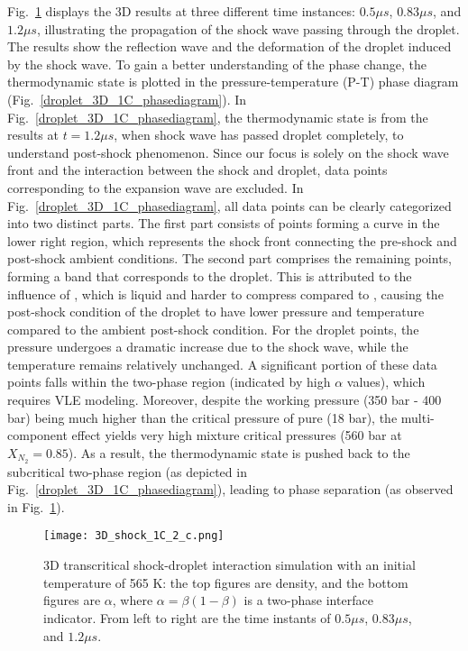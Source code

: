 Fig.~\ref{droplet_3d_1C} displays the 3D results at three different time instances: $0.5\mu s$, $0.83\mu s$, and $1.2\mu s$, illustrating the propagation of the shock wave passing through the droplet. The results show the reflection wave and the deformation of the droplet induced by the shock wave. To gain a better understanding of the phase change, the thermodynamic state is plotted in the pressure-temperature (P-T) phase diagram (Fig.~\ref{droplet_3D_1C_phasediagram}). In Fig.~\ref{droplet_3D_1C_phasediagram}, the thermodynamic state is from the results at $t=1.2\mu s$, when shock wave has passed droplet completely, to understand post-shock phenomenon. Since our focus is solely on the shock wave front and the interaction between the shock and droplet, data points corresponding to the expansion wave are excluded. In Fig.~\ref{droplet_3D_1C_phasediagram}, all data points can be clearly categorized into two distinct parts. The first part consists of points forming a curve in the lower right region, which represents the shock front connecting the pre-shock and post-shock ambient conditions. The second part comprises the remaining points, forming a band that corresponds to the droplet. This is attributed to the influence of , which is liquid and harder to compress compared to , causing the post-shock condition of the droplet to have lower pressure and temperature compared to the ambient post-shock condition. For the droplet points, the pressure undergoes a dramatic increase due to the shock wave, while the temperature remains relatively unchanged. A significant portion of these data points falls within the two-phase region (indicated by high $\alpha$ values), which requires VLE modeling. Moreover, despite the working pressure (350 bar - 400 bar) being much higher than the critical pressure of pure  (18 bar), the multi-component effect yields very high mixture critical pressures (560 bar at $X_{N_2} = 0.85$). As a result, the thermodynamic state is pushed back to the subcritical two-phase region (as depicted in Fig.~\ref{droplet_3D_1C_phasediagram}), leading to phase separation (as observed in Fig.~\ref{droplet_3d_1C}).

\begin{figure}[htbp]
	\centering
	\texttt{[image: 3D\_shock\_1C\_2\_c.png]}
	\caption{3D transcritical shock-droplet interaction simulation with an initial temperature of 565 K: the top figures are density, and the bottom figures are $\alpha$, where $\alpha = \beta (1-\beta)$ is a two-phase interface indicator. From left to right are the time instants of $0.5\mu s$, $0.83\mu s$, and $1.2\mu s$. }
	\label{droplet_3d_1C}
\end{figure}

